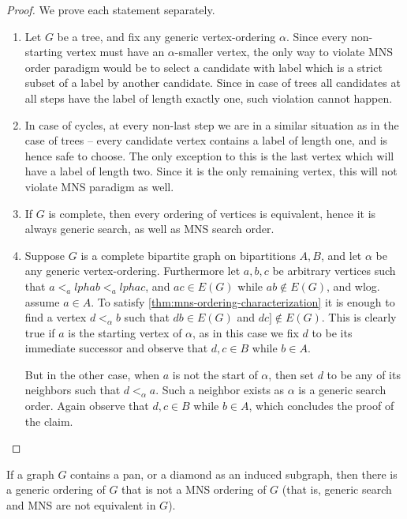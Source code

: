 \documentclass{svproc}
\begin{document}
\begin{proof}
We prove each statement separately.
\begin{enumerate}[nosep, label = \roman*)]
\item Let $G$ be a tree, and fix any generic vertex-ordering $\alpha$. Since every non-starting vertex must have an $\alpha$-smaller vertex, the only way to violate MNS order paradigm would be to select a candidate with label which is a strict subset of a label by another candidate. 
Since in case of trees all candidates at all steps have the label of length exactly one, such violation cannot happen. 
\item In case of cycles, at every non-last step we are in a similar situation as in the case of trees -- every candidate vertex contains a label of length one, and is hence safe to choose. 
The only exception to this is the last vertex which will have a label of length two. Since it is the only remaining vertex, this will not violate MNS paradigm as well.
\item If $G$ is complete, then every ordering of vertices is equivalent, hence it is always generic search, as well as MNS search order.
\item Suppose $G$ is a complete bipartite graph on bipartitions $A,B$, and let $\alpha$ be any generic vertex-ordering. Furthermore let $a,b,c$ be arbitrary vertices such that $a<_alpha b<_alpha c$, and $ac\in E(G)$ while $ab\notin E(G)$, and wlog. assume $a\in A$. To satisfy \cref{thm:mns-ordering-characterization} it is enough to find a vertex $d<_\alpha b$ such that $db\in E(G)$ and $dc]\notin E(G)$. This is clearly true if $a$ is the starting vertex of $\alpha$, as in this case we fix $d$ to be its immediate successor and observe that $d,c\in B$ while $b\in A$.

But in the other case, when $a$ is not the start of $\alpha$, then set $d$ to be any of its neighbors such that $d<_\alpha a$. Such a neighbor exists as $\alpha$ is a generic search order. Again observe that $d,c\in B$ while $b\in A$, which concludes the proof of the claim.
\end{enumerate}
\end{proof}

\begin{lemma}
If a graph $G$ contains a pan, or a diamond as an induced subgraph, 
then there is a generic ordering of $G$ that is not a MNS ordering of $G$ (that is, generic search and MNS are not equivalent in $G$).
\end{lemma}
\end{document}
